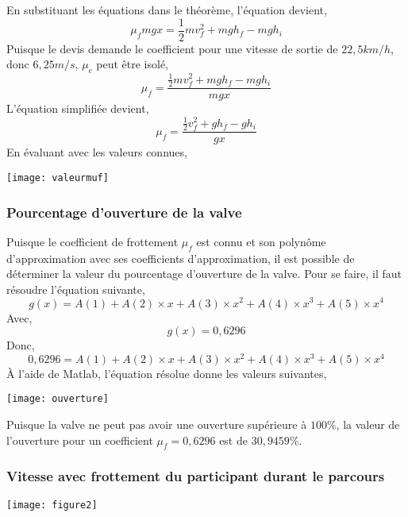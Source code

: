 \documentclass[12pt]{article}
\begin{document}
En substituant les équations dans le théorème, l'équation devient,
\begin{equation}
\mu_fmgx = \frac{1}{2}mv_f^2 + mgh_f - mgh_i
\end{equation}
Puisque le devis demande le coefficient pour une vitesse de sortie de $22,5km/h$, donc $6,25m/s$, $\mu_c$ peut être isolé,
\begin{equation}
\mu_f = \frac{\frac{1}{2}mv_f^2 + mgh_f - mgh_i}{mgx}
\end{equation}
L'équation simplifiée devient,
\begin{equation}
\mu_f = \frac{\frac{1}{2}v_f^2 + gh_f - gh_i}{gx}
\end{equation}
En évaluant avec les valeurs connues,
\begin{center}
	\texttt{[image: valeurmuf]}
\end{center}
\subsubsection{Pourcentage d'ouverture de la valve}
Puisque le coefficient de frottement $\mu_f$ est connu et son polynôme d'approximation avec ses coefficients d'approximation, il est possible de déterminer la valeur du pourcentage d'ouverture de la valve.
\newline
\newline
Pour se faire, il faut résoudre l'équation suivante,
\begin{equation}
g(x) = A(1) + A(2)\times x + A(3)\times x^2 + A(4)\times x^3 + A(5)\times x^4
\end{equation}
Avec,
\begin{equation}
g(x) = 0,6296
\end{equation}
Donc,
\begin{equation}
0,6296 = A(1) + A(2)\times x + A(3)\times x^2 + A(4)\times x^3 + A(5)\times x^4
\end{equation}
À l'aide de Matlab, l'équation résolue donne les valeurs suivantes,
\begin{center}
	\texttt{[image: ouverture]}
\end{center}
Puisque la valve ne peut pas avoir une ouverture supérieure à $100\%$, la valeur de l'ouverture pour un coefficient $\mu_f = 0,6296$ est de $30,9459\%$.
\subsubsection{Vitesse avec frottement du participant durant le parcours}
\begin{center}
	\texttt{[image: figure2]}
\end{center}
\end{document}
